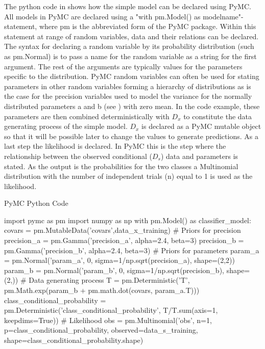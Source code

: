 \begin{example}
	The python code in  shows how the simple model can be declared using PyMC. All models in PyMC are declared using a "with pm.Model() as modelname"-statement, where pm is the abbreviated form of the PyMC package. Within this statement at range of random variables, data and their relations can be declared. The syntax for declaring a random variable by its probability distribution (such as pm.Normal) is to pass a name for the random variable as a string for the first argument. The rest of the arguments are typically values for the parameters specific to the distribution. PyMC random variables can often be used for stating parameters in other random variables forming a hierarchy of distributions as is the case for the precision variables used to model the variance for the normally distributed parameters a and b (see ) with zero mean. In the code example, these parameters are then combined deterministically with $D_x$ to constitute the data generating process of the simple model. $D_x$ is declared as a PyMC mutable object so that it will be possible later to change the values to generate predictions. As a last step the likelihood is declared. In PyMC this is the step where the relationship between the observed conditional ($D_s$) data and parameters is stated. As the output is the probabilities for the two classes a Multinomial distribution with the number of independent trials (n) equal to 1 is used as the likelihood. 
	
	\begin{algorithm}[H]
		\caption{PyMC Python Code}
		\begin{python}
			import pymc as pm
			import numpy as np
			with pm.Model() as classifier_model:
			covars = pm.MutableData('covars',data_x_training) 
			# Priors for precision
			precision_a = pm.Gamma('precision_a', alpha=2.4, beta=3)
			precision_b = pm.Gamma('precision_b', alpha=2.4, beta=3)
			# Priors for parameters
			param_a = pm.Normal('param_a', 
			0, 
			sigma=1/np.sqrt(precision_a),
			shape=(2,2))
			param_b = pm.Normal('param_b', 
			0, 
			sigma=1/np.sqrt(precision_b),
			shape=(2,))
			# Data generating process
			T = pm.Deterministic('T', pm.Math.exp(param_b + pm.math.dot(covars, param_a.T)))
			class_conditional_probability = pm.Deterministic('class_conditional_probability', T/T.sum(axis=1, keepdims=True))
			# Likelihood
			obs = pm.Multinomial('obs', n=1, p=class_conditional_probability, observed=data_s_training, shape=class_conditional_probability.shape)
		\end{python}
		\label{algo:pymc_model}
	\end{algorithm}
	

\end{example}

